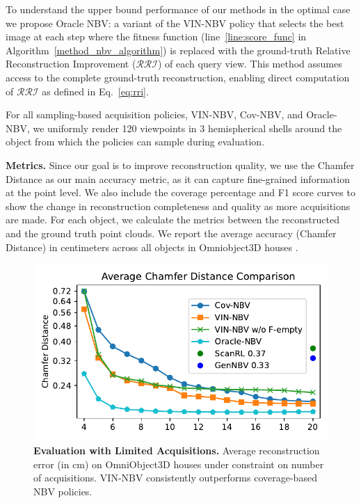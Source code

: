 To understand the upper bound performance of our methods in the optimal case we propose Oracle NBV: a variant of the VIN-NBV policy that selects the best image at each step where the fitness function (line~\ref{line:score_func} in Algorithm~\ref{method_nbv_algorithm}) is replaced with the ground-truth Relative Reconstruction Improvement ($\mathcal{RRI}$) of each query view. This method assumes access to the complete ground-truth reconstruction, enabling direct computation of $\mathcal{RRI}$ as defined in Eq.~\ref{eq:rri}. 

For all sampling-based acquisition policies, VIN-NBV, Cov-NBV, and Oracle-NBV, we uniformly render 120 viewpoints in 3 hemispherical shells around the object from which the policies can sample during evaluation.

\noindent\textbf{Metrics.} Since our goal is to improve reconstruction quality, we use the Chamfer Distance as our main accuracy metric, as it can capture fine-grained information at the point level. We also include the coverage percentage and F1 score curves to show the change in reconstruction completeness and quality as more acquisitions are made. For each object, we calculate the metrics between the reconstructed and the ground truth point clouds. We report the average accuracy (Chamfer Distance) in centimeters across all objects in Omniobject3D houses \cite{wu2023omniobject3d}.

\begin{figure}
  \centering
  \includegraphics[width=0.96\columnwidth]{Figures/house_combined_chamfer.pdf}
    \vspace{-1em}
    \caption{
    \textbf{Evaluation with Limited Acquisitions.} Average reconstruction error (in cm) on OmniObject3D \cite{wu2023omniobject3d} houses under constraint on number of acquisitions. VIN-NBV consistently outperforms coverage-based NBV policies.
    }
    \label{fig:chamfer_comparison}
    \vspace{0.5em}
\end{figure}

